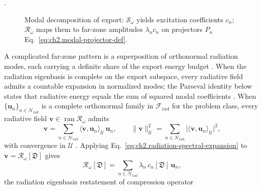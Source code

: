 \cite{stratton1941}.
\begin{figure}[t]
\centering
{}
\caption{Modal decomposition of export: \(\mathcal{S}_\omega\) yields excitation coefficients
\(c_n\); \(\mathcal{R}_\omega\) maps them to far-zone amplitudes \(\lambda_n c_n\) on
projectors \(P_n\) Eq.~\eqref{eq:ch2.modal-projector-def}.}
\label{fig:ch2.radiation-spectral-decomposition}
\end{figure}
A complicated far-zone pattern is a superposition of orthonormal radiation modes, each carrying a
definite share of the export energy budget \cite{stratton1941}. When the radiation eigenbasis is complete on the export subspace, every radiative field admits
a countable expansion in normalized modes; the Parseval identity below states that radiative
energy equals the sum of squared modal coefficients \cite{stratton1941}. When
\(\{\mathbf{u}_n\}_{n\in\mathcal{N}_{\mathrm{rad}}}\) is a complete orthonormal family
in \(\mathcal{F}_{\mathrm{rad}}\) for the problem class, every radiative field
\(\mathbf{v}\in\operatorname{ran}\mathcal{R}_\omega\) admits
\begin{equation}
\label{eq:ch2.radiation-spectral-expansion}
\mathbf{v}
=
\sum_{n\in\mathcal{N}_{\mathrm{rad}}}
\langle \mathbf{v},\mathbf{u}_n\rangle_{\mathcal{U}}\,\mathbf{u}_n,
\qquad
\|\mathbf{v}\|_{\mathcal{U}}^2
=
\sum_{n\in\mathcal{N}_{\mathrm{rad}}}
\big|\langle \mathbf{v},\mathbf{u}_n\rangle_{\mathcal{U}}\big|^2,
\end{equation} with convergence in \(\mathcal{U}\) \cite{stratton1941}. Applying
Eq.~\eqref{eq:ch2.radiation-spectral-expansion} to \(\mathbf{v}=\mathcal{R}_\omega[\mathfrak{D}]\)
gives
\begin{equation}
\label{eq:ch2.radiation-map-modal-sum}
\mathcal{R}_\omega[\mathfrak{D}]
=
\sum_{n\in\mathcal{N}_{\mathrm{rad}}}
\lambda_n\,c_n[\mathfrak{D}]\,\mathbf{u}_n,
\end{equation}
the radiation eigenbasis restatement of compression operator

